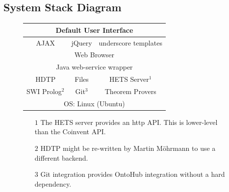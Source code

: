 \documentclass[10pt]{article}
\begin{document}
\subsection{System Stack Diagram}
\begin{figure}[!h]
\begin{center}
\begin{tabular}{|c|c|c|}
\hline
\multicolumn{3}{|c|}{Default User Interface}\\
\hline
AJAX&jQuery&underscore templates\\
\hline
\multicolumn{3}{|c|}{Web Browser}\\
\hline
\multicolumn{3}{|c|}{Java web-service wrapper}\\
\hline
HDTP&Files&HETS Server$^1$\\
\hline
SWI Prolog$^2$&Git$^3$&Theorem Provers\\
\hline
\multicolumn{3}{|c|}{OS: Linux (Ubuntu)}\\
\hline
\end{tabular}
\end{center}
\begin{footnotesize}
\begin{itemize}
\item[$1$]{The HETS server provides an http API. This is lower-level than the Coinvent API.}
\item[$2$]{HDTP might be re-written by Martin Möhrmann to use a different backend.}
\item[$3$]{Git integration provides OntoHub integration without a hard dependency.}
\end{itemize}
\end{footnotesize}
\end{figure}
\end{document}
